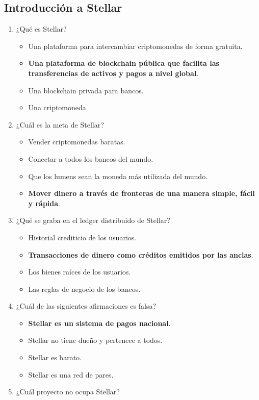\documentclass[a4paper,12pt]{/home/armando/Documentos/Cursos/LaTeX/Plantillas/lib/pub}
\begin{document}
	\subsection{Introducción a Stellar}
	\begin{enumerate}
		\item ¿Qué es Stellar?
		\begin{itemize}
			\item Una plataforma para intercambiar criptomonedas de forma gratuita.
			\item \textbf{Una plataforma de blockchain pública que facilita las transferencias de activos y pagos a nivel global}.
			\item Una blockchain privada para bancos.
			\item Una criptomoneda
		\end{itemize}
		\item ¿Cuál es la meta de Stellar?
		\begin{itemize}
			\item Vender criptomonedas baratas.
			\item Conectar a todos los bancos del mundo.
			\item Que los lumens sean la moneda más utilizada del mundo.
			\item \textbf{Mover dinero a través de fronteras de una manera simple, fácil y rápida}.
		\end{itemize}
	\item ¿Qué se graba en el ledger distribuido de Stellar?
	\begin{itemize}
		\item Historial crediticio de los usuarios.
		\item \textbf{Transacciones de dinero como créditos emitidos por las anclas}.
		\item Los bienes raíces de los usuarios.
		\item Las reglas de negocio de los bancos.
	\end{itemize}
	\item ¿Cuál de las siguientes afirmaciones es falsa?
	\begin{itemize}
		\item \textbf{Stellar es un sistema de pagos nacional}.
		\item Stellar no tiene dueño y pertenece a todos.
		\item Stellar es barato.
		\item Stellar es una red de pares.
	\end{itemize}
	\item ¿Cuál proyecto no ocupa Stellar?

\end{enumerate}
\end{document}
